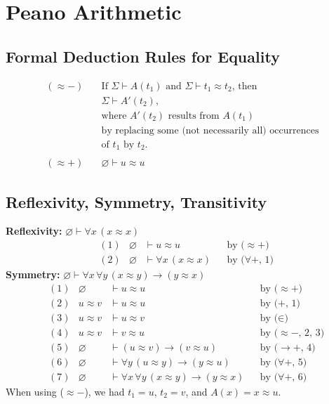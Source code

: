 \documentclass[11pt]{article}
\theoremstyle{definition}
\begin{document}
\newpage
\section{Peano Arithmetic}

\subsection{Formal Deduction Rules for Equality}
\vspace{-0.25cm}
\begin{align*}
(\approx-) \quad &\text{If $\Sigma \vdash A(t_1)$ and $\Sigma \vdash t_1 \approx t_2$, then} \\ &\text{$\Sigma \vdash A'(t_2)$,} \\ &\text{where $A'(t_2)$ results from $A(t_1)$} \\ &\text{by replacing some (not necessarily all) occurrences} \\ &\text{of $t_1$ by $t_2$.} \\\\
(\approx+) \quad &\varnothing \vdash u \approx u
\end{align*}

\subsection{Reflexivity, Symmetry, Transitivity}
{\bf Reflexivity:} $\varnothing \vdash \forall x \, (x \approx x)$
\begin{align*}
    &(1) & \varnothing &\vdash u \approx u & & \text{by ($\approx+$)} \\
    &(2) & \varnothing &\vdash \forall x \, (x \approx x) & & \text{by ($\forall+$, 1)}
\end{align*}
{\bf Symmetry:} $\varnothing \vdash \forall x \, \forall y \, (x \approx y) \to (y \approx x)$
\begin{align*}
    &(1) & \varnothing &\vdash u \approx u & & \text{by ($\approx+$)} \\
    &(2) & u \approx v &\vdash u \approx u & & \text{by ($+$, 1)} \\
    &(3) & u \approx v &\vdash u \approx v & & \text{by ($\in$)} \\
    &(4) & u \approx v &\vdash v \approx u & & \text{by ($\approx-$, 2, 3)} \\
    &(5) & \varnothing &\vdash (u \approx v) \to (v \approx u) & & \text{by ($\rightarrow+$, 4)} \\
    &(6) & \varnothing &\vdash \forall y \, (u \approx y) \to (y \approx u) & & \text{by ($\forall+$, 5)} \\
    &(7) & \varnothing &\vdash \forall x \, \forall y \, (x \approx y) \to (y \approx x) & & \text{by ($\forall+$, 6)}
\end{align*}
When using ($\approx-$), we had $t_1 = u$, $t_2 = v$, and $A(x) = x \approx u$.
\end{document}
